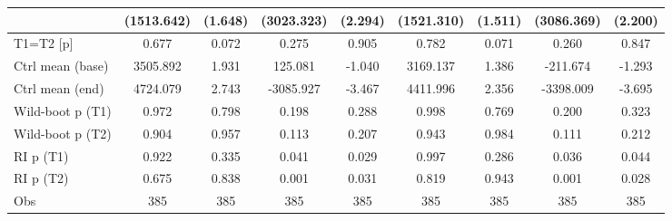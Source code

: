 {\begin{tabular}{l*{8}{c}}
                    &  (1513.642)         &     (1.648)         &  (3023.323)         &     (2.294)         &  (1521.310)         &     (1.511)         &  (3086.369)         &     (2.200)         \\
\midrule
T1=T2 [p]           &       0.677         &       0.072         &       0.275         &       0.905         &       0.782         &       0.071         &       0.260         &       0.847         \\
Ctrl mean (base)    &    3505.892         &       1.931         &     125.081         &      -1.040         &    3169.137         &       1.386         &    -211.674         &      -1.293         \\
Ctrl mean (end)     &    4724.079         &       2.743         &   -3085.927         &      -3.467         &    4411.996         &       2.356         &   -3398.009         &      -3.695         \\
Wild-boot p (T1)    &       0.972         &       0.798         &       0.198         &       0.288         &       0.998         &       0.769         &       0.200         &       0.323         \\
Wild-boot p (T2)    &       0.904         &       0.957         &       0.113         &       0.207         &       0.943         &       0.984         &       0.111         &       0.212         \\
RI p (T1)           &       0.922         &       0.335         &       0.041         &       0.029         &       0.997         &       0.286         &       0.036         &       0.044         \\
RI p (T2)           &       0.675         &       0.838         &       0.001         &       0.031         &       0.819         &       0.943         &       0.001         &       0.028         \\
Obs                 &         385         &         385         &         385         &         385         &         385         &         385         &         385         &         385         \\
\bottomrule
\end{tabular}
}
